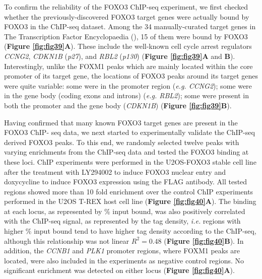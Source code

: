 To confirm the reliability of the FOXO3 ChIP-seq experiment, we first checked whether the previously-discovered FOXO3 target genes were actually bound by FOXO3 in the ChIP-seq dataset. Among the 34 manually-curated target genes in The Transcription Factor Encyclopaedia (\cite{yusuf2012the}), 15 of them were bound by FOXO3 (\textbf{Figure \ref{fig:fig39}A}). These include the well-known cell cycle arrest regulators \textit{CCNG2}, \textit{CDKN1B} (\textit{p27}), and \textit{RBL2} (\textit{p130}) (\textbf{Figure \ref{fig:fig39}A} and \textbf{B}). Interestingly, unlike the FOXM1 peaks which are mainly located within the core promoter of its target gene, the locations of FOXO3 peaks around its target genes were quite variable: some were in the promoter region (\textit{e.g. CCNG2}); some were in the gene body (coding exons and introns) (\textit{e.g. RBL2}); some were present in both the promoter and the gene body (\textit{CDKN1B}) (\textbf{Figure \ref{fig:fig39}B}).

Having confirmed that many known FOXO3 target genes are present in the FOXO3 ChIP- seq data, we next started to experimentally validate the ChIP-seq derived FOXO3 peaks. To this end, we randomly selected twelve peaks with varying enrichments from the ChIP-seq data and tested the FOXO3 binding at these loci. ChIP experiments were performed in the U2OS-FOXO3 stable cell line after the treatment with LY294002 to induce FOXO3 nuclear entry and doxycycline to induce FOXO3 expression using the FLAG antibody. All tested regions showed more than 10 fold enrichment over the control ChIP experiments performed in the U2OS T-REX host cell line (\textbf{Figure \ref{fig:fig40}A}). The binding at each locus, as represented by \% input bound, was also positively correlated with the ChIP-seq signal, as represented by the tag density, \textit{i.e.} regions with higher \% input bound tend to have higher tag density according to the ChIP-seq, although this relationship was not linear $R^2=0.48$ (\textbf{Figure \ref{fig:fig40}B}). In addition, the \textit{CCNB1} and \textit{PLK1} promoter regions, where FOXM1 peaks are located, were also included in the experiments as negative control regions. No significant enrichment was detected on either locus (\textbf{Figure \ref{fig:fig40}A}).

